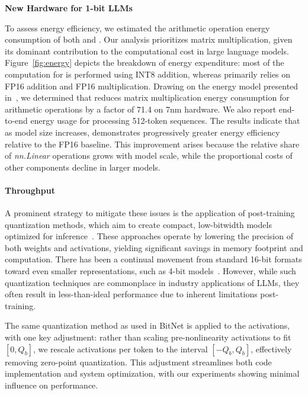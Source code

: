 \textbf{New Hardware for 1-bit LLMs}

To assess energy efficiency, we estimated the arithmetic operation energy consumption of both  and . Our analysis prioritizes matrix multiplication, given its dominant contribution to the computational cost in large language models. Figure~\ref{fig:energy} depicts the breakdown of energy expenditure: most of the computation for  is performed using INT8 addition, whereas  primarily relies on FP16 addition and FP16 multiplication. Drawing on the energy model presented in~\cite{energycost, pokebnn}, we determined that  reduces matrix multiplication energy consumption for arithmetic operations by a factor of 71.4 on 7nm hardware. We also report end-to-end energy usage for processing 512-token sequences. The results indicate that as model size increases,  demonstrates progressively greater energy efficiency relative to the FP16  baseline. This improvement arises because the relative share of \emph{nn.Linear} operations grows with model scale, while the proportional costs of other components decline in larger models.

\paragraph{Throughput}

A prominent strategy to mitigate these issues is the application of post-training quantization methods, which aim to create compact, low-bitwidth models optimized for inference~\cite{smoothquant, gptq, quip, quip_sharp}. These approaches operate by lowering the precision of both weights and activations, yielding significant savings in memory footprint and computation. There has been a continual movement from standard 16-bit formats toward even smaller representations, such as 4-bit models~\cite{gptq, awq}. However, while such quantization techniques are commonplace in industry applications of LLMs, they often result in less-than-ideal performance due to inherent limitations post-training.

The same quantization method as used in BitNet is applied to the activations, with one key adjustment: rather than scaling pre-nonlinearity activations to fit $[0, Q_b]$, we rescale activations per token to the interval $[-Q_b, Q_b]$, effectively removing zero-point quantization. This adjustment streamlines both code implementation and system optimization, with our experiments showing minimal influence on performance.

